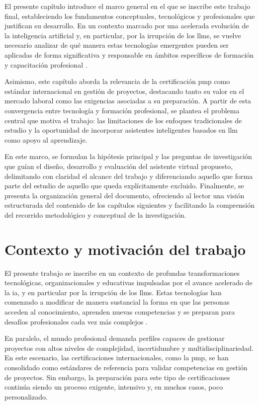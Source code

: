 El presente capítulo introduce el marco general en el que se inscribe este trabajo final, estableciendo los fundamentos conceptuales, tecnológicos y profesionales que justifican su desarrollo. En un contexto marcado por una acelerada evolución de la inteligencia artificial y, en particular, por la irrupción de los \glspl{llm}, se vuelve necesario analizar de qué manera estas tecnologías emergentes pueden ser aplicadas de forma significativa y responsable en ámbitos específicos de formación y capacitación profesional \parencite{zhao2023survey, gallegos2024bias}.

Asimismo, este capítulo aborda la relevancia de la certificación \gls{pmp} como estándar internacional en gestión de proyectos, destacando tanto su valor en el mercado laboral como las exigencias asociadas a su preparación. A partir de esta convergencia entre tecnología y formación profesional, se plantea el problema central que motiva el trabajo: las limitaciones de los enfoques tradicionales de estudio y la oportunidad de incorporar asistentes inteligentes basados en \gls{llm} como apoyo al aprendizaje.

En este marco, se formulan la hipótesis principal y las preguntas de investigación que guían el diseño, desarrollo y evaluación del asistente virtual propuesto, delimitando con claridad el alcance del trabajo y diferenciando aquello que forma parte del estudio de aquello que queda explícitamente excluido. Finalmente, se presenta la organización general del documento, ofreciendo al lector una visión estructurada del contenido de los capítulos siguientes y facilitando la comprensión del recorrido metodológico y conceptual de la investigación.

\section{Contexto y motivación del trabajo}

El presente trabajo se inscribe en un contexto de profundas transformaciones tecnológicas, organizacionales y educativas impulsadas por el avance acelerado de la \gls{ia}, y en particular por la irrupción de los \glspl{llm}. Estas tecnologías han comenzado a modificar de manera sustancial la forma en que las personas acceden al conocimiento, aprenden nuevas competencias y se preparan para desafíos profesionales cada vez más complejos \parencite{zhao2023survey}.

En paralelo, el mundo profesional demanda perfiles capaces de gestionar proyectos con altos niveles de complejidad, incertidumbre y multidisciplinariedad. En este escenario, las certificaciones internacionales, como la \gls{pmp}, se han consolidado como estándares de referencia para validar competencias en gestión de proyectos. Sin embargo, la preparación para este tipo de certificaciones continúa siendo un proceso exigente, intensivo y, en muchos casos, poco personalizado.

